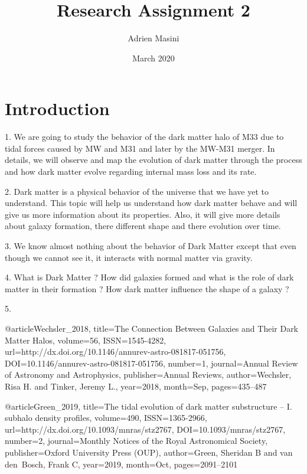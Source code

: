\documentclass{article}
\title{Research Assignment 2}
\author{Adrien Masini }
\date{March 2020}
\begin{document}
\maketitle
\section{Introduction}

1.
We are going to study the behavior of the dark matter halo of M33 due to tidal forces caused by MW and M31 and later by the MW-M31 merger. In details, we will observe and map the evolution of dark matter through the process and how dark matter evolve regarding internal mass loss and its rate.
\vspace{5mm}

2.
Dark matter is a physical behavior of the universe that we have yet to understand. This topic will help us understand how dark matter behave and will give us more information about its properties. Also, it will give more details about galaxy formation, there different shape and there evolution over time.
\vspace{5mm}

3.
We know almost nothing about the behavior of Dark Matter except that even though we cannot see it, it interacts with normal matter via gravity.
\vspace{5mm}

4.	
What is Dark Matter ? How did galaxies formed and what is the role of dark matter in their formation ? How dark matter influence the shape of a galaxy ?
\vspace{5mm}

5.

@article{Wechsler_2018,
   title={The Connection Between Galaxies and Their Dark Matter Halos},
   volume={56},
   ISSN={1545-4282},
   url={http://dx.doi.org/10.1146/annurev-astro-081817-051756},
   DOI={10.1146/annurev-astro-081817-051756},
   number={1},
   journal={Annual Review of Astronomy and Astrophysics},
   publisher={Annual Reviews},
   author={Wechsler, Risa H. and Tinker, Jeremy L.},
   year={2018},
   month={Sep},
   pages={435–487}
}

\vspace{5mm}

@article{Green_2019,
   title={The tidal evolution of dark matter substructure – I. subhalo density profiles},
   volume={490},
   ISSN={1365-2966},
   url={http://dx.doi.org/10.1093/mnras/stz2767},
   DOI={10.1093/mnras/stz2767},
   number={2},
   journal={Monthly Notices of the Royal Astronomical Society},
   publisher={Oxford University Press (OUP)},
   author={Green, Sheridan B and van den Bosch, Frank C},
   year={2019},
   month={Oct},
   pages={2091–2101}
}
\end{document}
